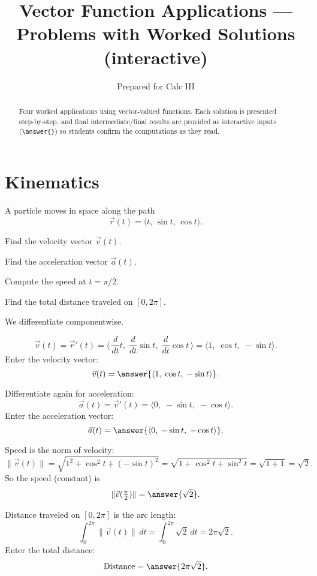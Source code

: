\documentclass{ximera}
\title{Vector Function Applications — Problems with Worked Solutions (interactive)}
\author{Prepared for Calc III}
\begin{document}
\begin{abstract}
Four worked applications using vector-valued functions. Each solution is presented step-by-step, and final intermediate/final results are provided as interactive inputs (\texttt{\textbackslash answer\{\}}) so students confirm the computations as they read.
\end{abstract}

\maketitle

\section*{Kinematics}

\begin{problem}
A particle moves in space along the path
\[
\vec{r}(t) = \langle t,\, \sin t,\, \cos t\rangle.
\]

Find the velocity vector $\vec{v}(t)$.

Find the acceleration vector $\vec{a}(t)$.

Compute the speed at $t=\pi/2$.

Find the total distance traveled on $[0,2\pi]$.
\end{problem}

\begin{solution}
We differentiate componentwise.

\[
\vec{v}(t)=\vec r'(t)
= \langle \,\frac{d}{dt}t,\; \frac{d}{dt}\sin t,\; \frac{d}{dt}\cos t \,\rangle
= \langle 1,\; \cos t,\; -\sin t\rangle.
\]
Enter the velocity vector:
\[
\vec{v}(t)=\answer{\langle 1,\;\cos t,\; -\sin t\rangle}.
\]

Differentiate again for acceleration:
\[
\vec{a}(t)=\vec v'(t)=\langle 0,\; -\sin t,\; -\cos t\rangle.
\]
Enter the acceleration vector:
\[
\vec{a}(t)=\answer{\langle 0,\; -\sin t,\; -\cos t\rangle}.
\]

Speed is the norm of velocity:
\[
\|\vec v(t)\|=\sqrt{1^2+\cos^2 t+(-\sin t)^2}
=\sqrt{1+\cos^2 t+\sin^2 t}=\sqrt{1+1}=\sqrt{2}.
\]
So the speed (constant) is
\[
\|\vec v(\tfrac{\pi}{2})\|=\answer{\sqrt{2}}.
\]

Distance traveled on $[0,2\pi]$ is the arc length:
\[
\int_0^{2\pi} \|\vec v(t)\|\,dt = \int_0^{2\pi} \sqrt{2}\,dt
= 2\pi\sqrt{2}.
\]
Enter the total distance:
\[
\text{Distance}=\answer{2\pi\sqrt{2}}.
\]

\bigskip
\begin{multipleChoice}
\end{multipleChoice}
\end{solution}
\end{document}
